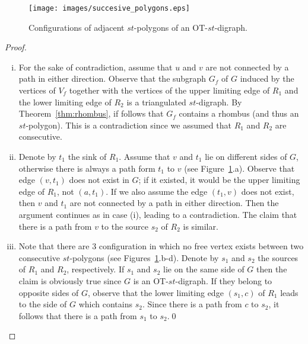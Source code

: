 \documentclass{myllncs-mixalis}
\begin{document}
\begin{figure}[htb]
    \centering
    \texttt{[image: images/succesive\_polygons.eps]}
    \caption{Configurations of adjacent $st$-polygons of an OT-$st$-digraph.}
    \label{fig:succesivePolygons}
\end{figure}

\begin{proof}
$~$\\\vspace*{-1.0cm}
\begin{enumerate}[(i)]
\item
For the sake of contradiction, assume that $u$ and $v$ are not
connected by a path in either direction. Observe that the subgraph
$G_f$ of $G$ induced by the vertices of $V_f$ together with  the
vertices of the   upper limiting edge of $R_1$ and the lower
limiting edge of $R_2$ is a triangulated $st$-digraph. By
Theorem~\ref{thm:rhombus}, if follows that $G_f$ contains a rhombus
(and thus an $st$-polygon). This is a contradiction since we assumed
that $R_1$ and $R_2$ are consecutive.

\item Denote by $t_1$ the sink of $R_1$. Assume that $v$ and $t_1$ lie on different sides of $G$, otherwise there is
always a path form $t_1$ to $v$ (see
Figure~\ref{fig:succesivePolygons}.a). Observe that edge $(v, t_1)$
does not exist in $G$; if it existed, it would be the upper limiting
edge of $R_1$, not $(a, t_1)$. If we also assume the edge $(t_1, v)$
does not exist, then $v$ and $t_1$ are not connected by a path in
either direction. Then the argument continues as in case (i),
leading to a contradiction. The claim that there is a path from $v$
to the source $s_2$ of $R_2$ is similar.

\item Note that there are 3 configuration  in which no free vertex exists between two consecutive
$st$-polygons (see Figures~\ref{fig:succesivePolygons}.b-d). Denote
by $s_1$ and $s_2$ the sources of $R_1$ and $R_2$, respectively. If
$s_1$ and $s_2$ lie on the same side of $G$ then the claim is
obviously true since $G$ is an OT-$st$-digraph. If they belong to
opposite sides of $G$, observe that the lower limiting edge
$(s_1,c)$ of $R_1$ leads to the side of $G$ which contains $s_2$.
Since there is a path from $c$ to $s_2$, it follows that there is a
path from $s_1$ to $s_2$.\qed
\end{enumerate}
\end{proof}
\end{document}
